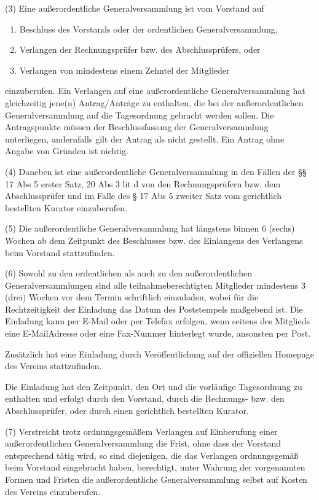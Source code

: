\documentclass[11pt,a4paper]{article}
\begin{document}
(3)
Eine außerordentliche Generalversammlung ist vom Vorstand auf

\begin{enumerate}[label=\alph*)]
\item
Beschluss des Vorstands oder der ordentlichen Generalversammlung,
\item
Verlangen der Rechnungsprüfer bzw. des Abschlussprüfers, oder
\item
Verlangen von mindestens einem Zehntel der Mitglieder
\end{enumerate}

einzuberufen.
Ein Verlangen auf eine außerordentliche Generalversammlung hat gleichzeitig jene(n) Antrag/Anträge zu enthalten, die bei der außerordentlichen Generalversammlung auf die Tagesordnung gebracht werden sollen.
Die Antragspunkte müssen der Beschlussfassung der Generalversammlung unterliegen, andernfalls gilt der Antrag als nicht gestellt.
Ein Antrag ohne Angabe von Gründen ist nichtig.

(4)
Daneben ist eine außerordentliche Generalversammlung in den Fällen der §§ 17 Abs 5 erster Satz, 20 Abs 3 lit d von den Rechnungsprüfern bzw. dem Abschlussprüfer und im Falle des § 17 Abs 5 zweiter Satz vom gerichtlich bestellten Kurator einzuberufen.

(5)
Die außerordentliche Generalversammlung hat längstens binnen 6 (sechs) Wochen ab dem Zeitpunkt des Beschlusses bzw. des Einlangens des Verlangens beim Vorstand stattzufinden.

(6)
Sowohl zu den ordentlichen als auch zu den außerordentlichen Generalversammlungen sind alle teilnahmeberechtigten Mitglieder mindestens 3 (drei) Wochen vor dem Termin schriftlich einzuladen, wobei für die Rechtzeitigkeit der Einladung das Datum des Poststempels maßgebend ist.
Die Einladung kann per E-Mail oder per Telefax erfolgen, wenn seitens des Mitglieds eine E-MailAdresse oder eine Fax-Nummer hinterlegt wurde, ansonsten per Post.

Zusätzlich hat eine Einladung durch Veröffentlichung auf der offiziellen Homepage des Vereins stattzufinden.

Die Einladung hat den Zeitpunkt, den Ort und die vorläufige Tagesordnung zu enthalten und erfolgt durch den Vorstand, durch die Rechnungs- bzw. den Abschlussprüfer, oder durch einen gerichtlich bestellten Kurator.

(7)
Verstreicht trotz ordnungsgemäßem Verlangen auf Einberufung einer außerordentlichen Generalversammlung die Frist, ohne dass der Vorstand entsprechend tätig wird, so sind diejenigen, die das Verlangen ordnungsgemäß beim Vorstand eingebracht haben, berechtigt, unter Wahrung der vorgenannten Formen und Fristen die außerordentliche Generalversammlung selbst auf Kosten des Vereins einzuberufen.
\end{document}
